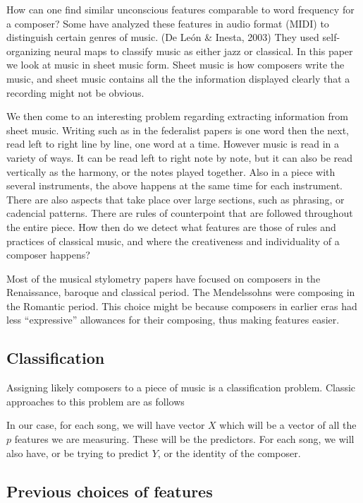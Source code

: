 \documentclass[12pt,twoside]{reedthesis}
\theoremstyle{definition}
\theoremstyle{definition}
\theoremstyle{definition}
\theoremstyle{remark}
\begin{document}
How can one find similar unconscious features comparable to word
frequency for a composer? Some have analyzed these features in audio
format (MIDI) to distinguish certain genres of music. (De León \&
Inesta, 2003) They used self-organizing neural maps to classify music as
either jazz or classical. In this paper we look at music in sheet music
form. Sheet music is how composers write the music, and sheet music
contains all the the information displayed clearly that a recording
might not be obvious.

We then come to an interesting problem regarding extracting information
from sheet music. Writing such as in the federalist papers is one word
then the next, read left to right line by line, one word at a time.
However music is read in a variety of ways. It can be read left to right
note by note, but it can also be read vertically as the harmony, or the
notes played together. Also in a piece with several instruments, the
above happens at the same time for each instrument. There are also
aspects that take place over large sections, such as phrasing, or
cadencial patterns. There are rules of counterpoint that are followed
throughout the entire piece. How then do we detect what features are
those of rules and practices of classical music, and where the
creativeness and individuality of a composer happens?

Most of the musical stylometry papers have focused on composers in the
Renaissance, baroque and classical period. The Mendelssohns were
composing in the Romantic period. This choice might be because composers
in earlier eras had less ``expressive'' allowances for their composing,
thus making features easier.

\subsection{Classification}\label{classification}

Assigning likely composers to a piece of music is a classification
problem. Classic approaches to this problem are as follows

In our case, for each song, we will have vector \(X\) which will be a
vector of all the \(p\) features we are measuring. These will be the
predictors. For each song, we will also have, or be trying to predict
\(Y\), or the identity of the composer.

\subsection{Previous choices of
features}\label{previous-choices-of-features}
\end{document}
